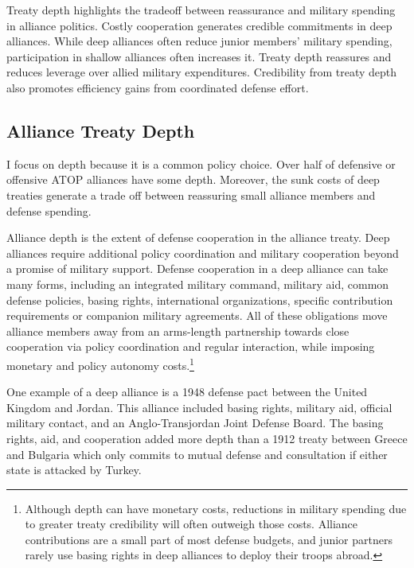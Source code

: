 \documentclass[12pt]{article}
\begin{document}
Treaty depth highlights the tradeoff between reassurance and military spending in alliance politics.
Costly cooperation generates credible commitments in deep alliances. 
While deep alliances often reduce junior members' military spending, participation in shallow alliances often increases it. 
Treaty depth reassures and reduces leverage over allied military expenditures. 
Credibility from treaty depth also promotes efficiency gains from coordinated defense effort. 


\subsection{Alliance Treaty Depth} 


I focus on depth because it is a common policy choice.
Over half of defensive or offensive ATOP alliances have some depth. 
Moreover, the sunk costs of deep treaties generate a trade off between reassuring small alliance members and defense spending.


Alliance depth is the extent of defense cooperation in the alliance treaty. 
Deep alliances require additional policy coordination and military cooperation beyond a promise of military support.  
Defense cooperation in a deep alliance can take many forms, including an integrated military command, military aid, common defense policies, basing rights, international organizations, specific contribution requirements or companion military agreements. 
All of these obligations move alliance members away from an arms-length partnership towards close cooperation via policy coordination and regular interaction, while imposing monetary and policy autonomy costs.\footnote{Although depth can have monetary costs, reductions in military spending due to greater treaty credibility will often outweigh those costs. Alliance contributions are a small part of most defense budgets, and junior partners rarely use basing rights in deep alliances to deploy their troops abroad.} 

 
One example of a deep alliance is a 1948 defense pact between the United Kingdom and Jordan.
This alliance included basing rights, military aid, official military contact, and an Anglo-Transjordan Joint Defense Board.  
The basing rights, aid, and cooperation added more depth than a 1912 treaty between Greece and Bulgaria which only commits to mutual defense and consultation if either state is attacked by Turkey. 
\end{document}

